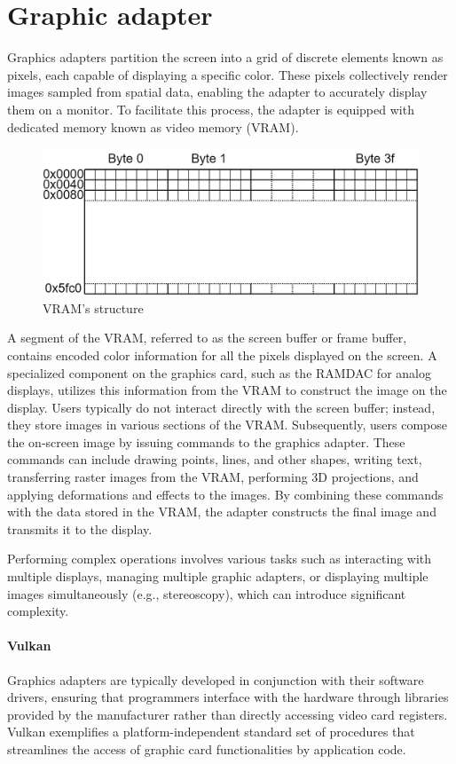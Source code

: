 \section{Graphic adapter}

Graphics adapters partition the screen into a grid of discrete elements known as pixels, each capable of displaying a specific color. 
These pixels collectively render images sampled from spatial data, enabling the adapter to accurately display them on a monitor.
To facilitate this process, the adapter is equipped with dedicated memory known as video memory (VRAM).

\begin{figure}[H]
    \centering
    \includegraphics[width=0.5\linewidth]{images/adapter.png}
    \caption{VRAM's structure}
\end{figure}

A segment of the VRAM, referred to as the screen buffer or frame buffer, contains encoded color information for all the pixels displayed on the screen.
A specialized component on the graphics card, such as the RAMDAC for analog displays, utilizes this information from the VRAM to construct the image on the display.
Users typically do not interact directly with the screen buffer; instead, they store images in various sections of the VRAM.
Subsequently, users compose the on-screen image by issuing commands to the graphics adapter.
These commands can include drawing points, lines, and other shapes, writing text, transferring raster images from the VRAM, performing 3D projections, and applying deformations and effects to the images. 
By combining these commands with the data stored in the VRAM, the adapter constructs the final image and transmits it to the display.

Performing complex operations involves various tasks such as interacting with multiple displays, managing multiple graphic adapters, or displaying multiple images simultaneously (e.g., stereoscopy), which can introduce significant complexity.

\paragraph*{Vulkan}
Graphics adapters are typically developed in conjunction with their software drivers, ensuring that programmers interface with the hardware through libraries provided by the manufacturer rather than directly accessing video card registers. 
Vulkan exemplifies a platform-independent standard set of procedures that streamlines the access of graphic card functionalities by application code.